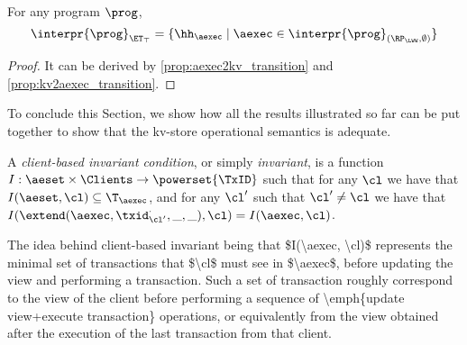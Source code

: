 \begin{corollary}
For any program $\prog$, 
\[
\interpr{\prog}_{\ET_{\top}} = \{\hh_{\aexec} \mid \aexec \in \interpr{\prog}_{(\RP_{\LWW}, \emptyset)}\}
\]
\end{corollary}
\begin{proof}
    It can be derived by \cref{prop:aexec2kv_transition} and \cref{prop:kv2aexec_transition}.
\end{proof}


To conclude this Section, we show how all the results illustrated so far 
can be put together to show that the kv-store operational semantics is adequate. 
\begin{definition}
A \emph{client-based invariant condition}, or simply \emph{invariant}, is a 
function $I : \aeset \times \Clients \rightarrow \powerset{\TxID}$ 
such that for any $\cl$ we have that $I(\aeset, \cl) \subseteq \T_{\aexec}$, and 
for any  $\cl'$ such that $\cl' \neq \cl$ we have that 
$I(\extend(\aexec, \txid_{\cl'}^{\cdot}, \_, \_), \cl) = I(\aexec, \cl)$.
\end{definition}
\ac{The idea behind client-based invariant being that $I(\aexec, \cl)$ represents 
the minimal set of transactions that $\cl$ must see in $\aexec$, before 
updating the view and performing a transaction. Such a set of transaction 
roughly correspond to the view of the client before performing a 
sequence of \emph{update view+execute transaction} operations, 
or equivalently from the view obtained after the execution of the 
last transaction from that client.}

